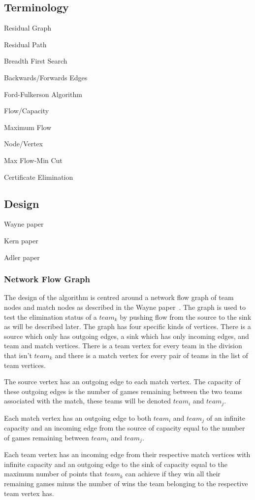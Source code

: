 \subsection{Terminology}
Residual Graph

Residual Path

Breadth First Search

Backwards/Forwards Edges

Ford-Fulkerson Algorithm

Flow/Capacity

Maximum Flow

Node/Vertex

Max Flow-Min Cut

Certificate Elimination

\subsection{Design}

Wayne paper~\cite{Wayne}

Kern paper~\cite{Kern}

Adler paper~\cite{Adler}

\subsubsection{Network Flow Graph}

The design of the algorithm is centred around a network flow graph of
team nodes and match nodes as described in the Wayne
paper~\cite{Wayne}. The graph is used to test the elimination status of a
$team_k$ by pushing flow from the source to the sink as will be described 
later. The graph has four specific kinds of vertices. There is a source
which only has outgoing edges, a sink which has only incoming edges, and
team and match vertices. There is a team vertex for every team in the
division that isn't $team_k$ and there is a match vertex for every pair
of teams in the list of team vertices.

The source vertex has an outgoing edge to each match vertex.
The capacity of these outgoing edges is the number of games remaining between
the two teams associated with the match, these teams will be denoted
$team_i$ and $team_j$.

Each match vertex has an outgoing edge to both $team_i$ and $team_j$ of an 
infinite capacity and an incoming edge from the source of capacity equal to the 
number of games remaining between $team_i$ and $team_j$.

Each team vertex has an incoming edge from their respective match vertices with
infinite capacity and an outgoing edge to the sink of capacity equal to the 
maximum number of points that $team_k$ can achieve if they win all their 
remaining games minus the number of wins the team belonging to the respective 
team vertex has. 

